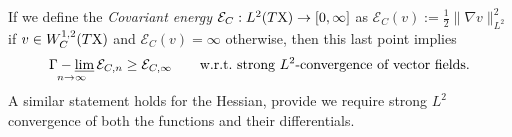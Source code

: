 \documentclass[11pt]{article}
\numberwithin{equation}{section}
\newcommand{\X}{{\rm X}}
\newcommand{\mm}{{\mathfrak m}}
\newcommand{\ch}{{\sf Ch}}
\renewcommand{\d}{{\rm d}}
\renewcommand{\div}{{\rm div}}
\newcommand{\Hess}{{\rm Hess}}
\newcommand{\limi}{\varliminf}
\newcommand{\weakto}{\rightharpoonup}
\DeclareMathOperator*{\glimi}{{\Gamma-\limi}}
\begin{document}
\begin{enumerate}[label=(\roman*)]
%
%
%
\end{enumerate}
If we define the \emph{Covariant energy} $\mathcal E_C:L^2(T\X)\to[0,\infty]$ as $\mathcal E_C(v):=\tfrac12\|\nabla v\|^2_{L^2}$ if $v\in W^{1,2}_C(T\X)$ and $\mathcal E_C(v)=\infty$ otherwise, then  this last point implies 
\[
\glimi_{n\to\infty}\mathcal E_{C,n}\geq \mathcal E_{C,\infty}\qquad\text{w.r.t.\ strong $L^2$-convergence of vector fields.}
\]
A similar statement holds for the Hessian, provide we require strong $L^2$ convergence of both the functions and their differentials.
\end{document}
